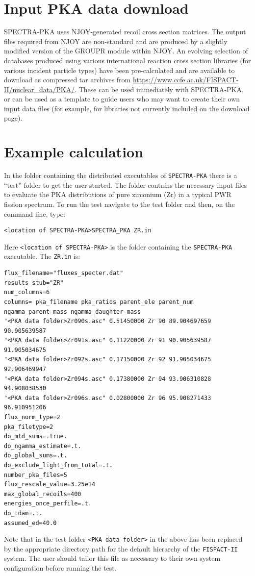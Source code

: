 \documentclass[a4paper]{article}
\begin{document}
\section{Input PKA data download}

SPECTRA-PKA uses NJOY-generated recoil cross section matrices. The output files required from NJOY are non-standard and are produced by a slightly modified version of the GROUPR module within NJOY. An evolving selection of databases produced using various international reaction cross section libraries (for various incident particle types) have been pre-calculated and are available to download as compressed tar archives from \url{https://www.ccfe.ac.uk/FISPACT-II/nuclear_data/PKA/}. These can be used immediately with SPECTRA-PKA, or can be used as a template to guide users who may want to create their own input data files (for example, for libraries not currently included on the download page).



\section{Example calculation}
In the folder containing the distributed executables of \texttt{SPECTRA-PKA} there is a ``test'' folder to get the user started. The folder contains the necessary input files to evaluate the PKA distributions of pure zirconium (Zr) in a typical PWR fission spectrum. To run the test navigate to the test folder and then, on the command line, type:
\begin{verbatim}
<location of SPECTRA-PKA>SPECTRA_PKA ZR.in
\end{verbatim}
Here \texttt{<location of SPECTRA-PKA>} is the folder containing the \texttt{SPECTRA-PKA} executable. The \texttt{ZR.in} is:
{\footnotesize
\begin{verbatim}
flux_filename="fluxes_specter.dat"
results_stub="ZR"
num_columns=6
columns= pka_filename pka_ratios parent_ele parent_num ngamma_parent_mass ngamma_daughter_mass
"<PKA data folder>Zr090s.asc" 0.51450000 Zr 90 89.904697659 90.905639587
"<PKA data folder>Zr091s.asc" 0.11220000 Zr 91 90.905639587 91.905034675
"<PKA data folder>Zr092s.asc" 0.17150000 Zr 92 91.905034675 92.906469947
"<PKA data folder>Zr094s.asc" 0.17380000 Zr 94 93.906310828 94.908038530
"<PKA data folder>Zr096s.asc" 0.02800000 Zr 96 95.908271433 96.910951206
flux_norm_type=2
pka_filetype=2
do_mtd_sums=.true.
do_ngamma_estimate=.t.
do_global_sums=.t.
do_exclude_light_from_total=.t.
number_pka_files=5
flux_rescale_value=3.25e14
max_global_recoils=400
energies_once_perfile=.t.
do_tdam=.t.
assumed_ed=40.0
\end{verbatim}}
Note that in the test folder \texttt{<PKA data folder>} in the above has been replaced by the appropriate directory path for the default hierarchy of the \texttt{FISPACT-II} system. The user should tailor this file as necessary to their own system configuration before running the test.
\end{document}
